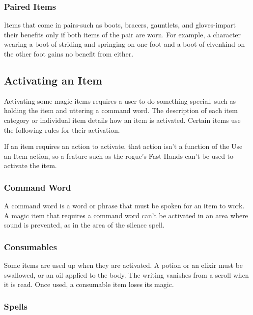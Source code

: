 \documentclass[
]{article}
\begin{document}
\hypertarget{paired-items}{%
\subsubsection{Paired Items}\label{paired-items}}

Items that come in pairs-such as boots, bracers, gauntlets, and
gloves-impart their benefits only if both items of the pair are worn.
For example, a character wearing a boot of striding and springing on one
foot and a boot of elvenkind on the other foot gains no benefit from
either.

\hypertarget{activating-an-item}{%
\subsection{Activating an Item}\label{activating-an-item}}

Activating some magic items requires a user to do something special,
such as holding the item and uttering a command word. The description of
each item category or individual item details how an item is activated.
Certain items use the following rules for their activation.

If an item requires an action to activate, that action isn't a function
of the Use an Item action, so a feature such as the rogue's Fast Hands
can't be used to activate the item.

\hypertarget{command-word}{%
\subsubsection{Command Word}\label{command-word}}

A command word is a word or phrase that must be spoken for an item to
work. A magic item that requires a command word can't be activated in an
area where sound is prevented, as in the area of the silence spell.

\hypertarget{consumables}{%
\subsubsection{Consumables}\label{consumables}}

Some items are used up when they are activated. A potion or an elixir
must be swallowed, or an oil applied to the body. The writing vanishes
from a scroll when it is read. Once used, a consumable item loses its
magic.

\hypertarget{spells}{%
\subsubsection{Spells}\label{spells}}
\end{document}

